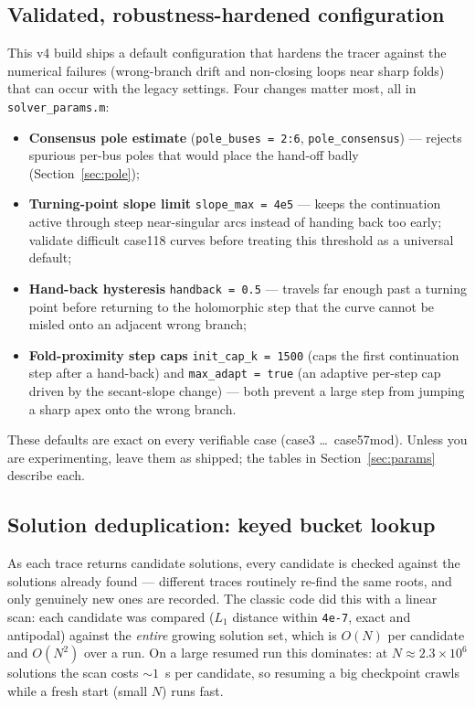 \documentclass[11pt,a4paper]{article}
\newcommand{\code}[1]{\texttt{#1}}
\begin{document}
\subsection{Validated, robustness-hardened configuration}\label{sec:tuned}
This v4 build ships a default configuration that hardens the tracer
against the numerical failures (wrong-branch drift and non-closing loops near sharp folds)
that can occur with the legacy settings. Four changes matter most, all in
\code{solver_params.m}:
\begin{itemize}[leftmargin=1.4em]
  \item \textbf{Consensus pole estimate} (\code{pole_buses = 2:6}, \code{pole_consensus})
        --- rejects spurious per-bus poles that would place the hand-off badly
        (Section~\ref{sec:pole});
  \item \textbf{Turning-point slope limit} \code{slope_max = 4e5} --- keeps the
        continuation active through steep near-singular arcs instead of handing back too
        early; validate difficult case118 curves before treating this threshold as a
        universal default;
  \item \textbf{Hand-back hysteresis} \code{handback = 0.5} --- travels far enough past a
        turning point before returning to the holomorphic step that the curve cannot be
        misled onto an adjacent wrong branch;
  \item \textbf{Fold-proximity step caps} \code{init_cap_k = 1500} (caps the first
        continuation step after a hand-back) and \code{max_adapt = true} (an adaptive
        per-step cap driven by the secant-slope change) --- both prevent a large step from
        jumping a sharp apex onto the wrong branch.
\end{itemize}
These defaults are exact on every verifiable case (case3 \dots\ case57mod). Unless you are
experimenting, leave them as shipped; the tables in Section~\ref{sec:params} describe each.

\subsection{Solution deduplication: keyed bucket lookup}\label{sec:dedup}
As each trace returns candidate solutions, every candidate is checked against the solutions
already found --- different traces routinely re-find the same roots, and only genuinely new
ones are recorded. The classic code did this with a linear scan: each candidate was compared
($L_1$ distance within \code{4e-7}, exact and antipodal) against the \emph{entire} growing
solution set, which is $O(N)$ per candidate and $O(N^2)$ over a run. On a large resumed run
this dominates: at $N\approx2.3\times10^{6}$ solutions the scan costs ${\sim}1$~s per
candidate, so resuming a big checkpoint crawls while a fresh start (small $N$) runs fast.
\end{document}
